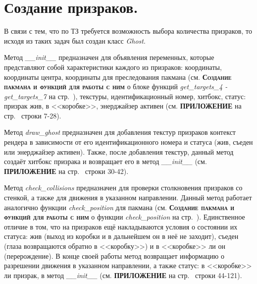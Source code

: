\section{\label{sec:ch02/sec01/sub06}Создание призраков.}
В связи с тем, что по ТЗ требуется возможность выбора количества призраков, то исходя из таких задач был создан класс \textit{Ghost}. 

Метод \textit{\_\_init\_\_} предназначен для объявления переменных, которые представляют собой характеристики каждого из призраков: координаты, координаты центра, координаты для преследования пакмана (см. \textbf{\textsc{Создание пакмана и функций для работы с ним}} о блоке функций \textit{get\_targets\_4 - get\_targets\_7} на стр.~\pageref{sec:ch02/sec01/sub05}), текстуры, идентификационный номер, хитбокс, статус: призрак жив, в <<коробке>>, энерджайзер активен (см. \textbf{\textsc{ПРИЛОЖЕНИЕ}} на стр.~\pageref{code:ghost} строки 7-28).

Метод \textit{draw\_ghost} предназначен для добавления текстур призраков контекст рендера в зависимости от его идентификационного номера и статуса (жив, съеден или энерджайзер активен). Также, после добавления текстур, данный метод создаёт хитбокс призрака и возвращает его в метод \textit{\_\_init\_\_} (см. \textbf{\textsc{ПРИЛОЖЕНИЕ}} на стр.~\pageref{code:ghost} строки 30-42).

Метод \textit{check\_collisions} предназначен для проверки столкновения призраков со стенкой, а также для движения в указанном направлении. Данный метод работает аналогично функции \textit{check\_position} для пакмана (см. \textbf{\textsc{Создание пакмана и функций для работы с ним}} о функции \textit{check\_position} на стр.~\pageref{sec:ch02/sec01/sub05}). Единственное отличие в том, что на призраков ещё накладываются условия о состоянии их статуса: жив (выход из коробки и в дальнейшем он в неё не заходит), съеден (глаза возвращаются обратно в <<коробку>>) и в <<коробке>> ли он (перерождение). В конце своей работы метод возвращает информацию о разрешении движения в указанном направлении, а также статус: в <<коробке>> ли призрак, в метод \textit{\_\_init\_\_} (см. \textbf{\textsc{ПРИЛОЖЕНИЕ}} на стр.~\pageref{code:ghost} строки 44-121).

